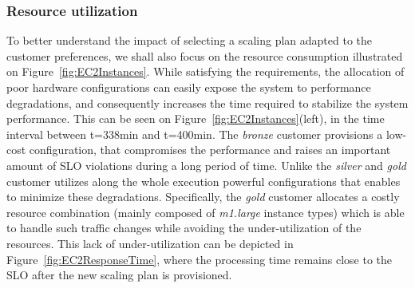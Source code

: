 \subsubsection{Resource utilization} 
To better understand the impact of selecting a scaling plan adapted to the customer preferences, we shall also focus on the resource consumption illustrated on Figure~\ref{fig:EC2Instances}. While satisfying the requirements, the allocation of poor hardware configurations can easily expose the system to performance degradations, and consequently increases the time required to stabilize the system performance. This can be seen on  Figure~\ref{fig:EC2Instances}(left), in the time interval between t=338min and t=400min. The \emph{bronze} customer provisions a low-cost configuration, that compromises the performance and raises an important amount of SLO violations during a long period of time. Unlike the \emph{silver} and \emph{gold} customer utilizes along the whole execution powerful configurations that enables to minimize these degradations. Specifically, the \emph{gold} customer allocates a costly resource combination (mainly composed of \emph{m1.large} instance types) which is able to handle such traffic changes while avoiding the under-utilization of the resources. This lack of under-utilization can be depicted in Figure~\ref{fig:EC2ResponseTime}, where the processing time remains close to the SLO after the new scaling plan is provisioned.


